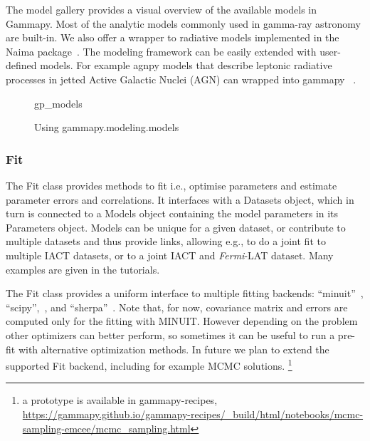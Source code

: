The model gallery provides a visual overview of the available models in
Gammapy. Most of the analytic models  commonly used in gamma-ray astronomy are
built-in. We also offer a wrapper to radiative models implemented in the Naima
package~\cite{naima}. The modeling framework can be easily extended with
user-defined models. For example agnpy models that describe leptonic radiative
processes in jetted Active Galactic Nuclei (AGN) can wrapped into
gammapy~\citep[see section3.5 of ][]{2021arXiv211214573N} .

\begin{figure}
	{gp_models}
	\caption{Using gammapy.modeling.models}
	\label{fig*:minted:gp_models}
\end{figure}

\subsubsection{Fit}
\label{sssec:fit}

The Fit class provides methods to fit i.e., optimise parameters and estimate
parameter errors and correlations. It interfaces with a Datasets object, which
in turn is connected to a Models object containing the model parameters in its
Parameters object. Models can be unique for a given dataset, or contribute to
multiple datasets and thus provide links, allowing e.g., to do a joint fit to
multiple IACT datasets, or to a joint IACT and \textit{Fermi}-LAT dataset. Many
examples are given in the tutorials.

The Fit class provides a uniform interface to multiple fitting backends:
“minuit”~\citep{iminuit}, “scipy”,~\citep{2020SciPy-NMeth}, and
“sherpa”~\citep{sherpa-2005,sherpa-2011}. Note that, for now, covariance matrix
and errors are computed only for the fitting with MINUIT. However depending on
the problem other optimizers can better perform, so sometimes it can be useful
to run a pre-fit with alternative optimization methods. In future we plan to
extend the supported Fit backend, including for example MCMC solutions.
\footnote{a prototype is available in gammapy-recipes,
	\url{https://gammapy.github.io/gammapy-recipes/_build/html/notebooks/mcmc-sampling-emcee/mcmc_sampling.html}
}
